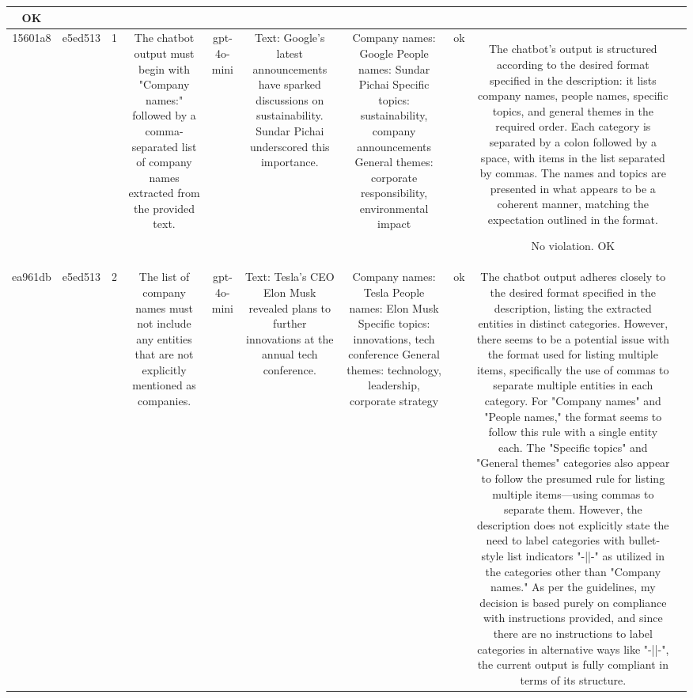 \begin{table}[h!]
\begin{tabular}{|c|c|c|c|c|c|c|c|c|c|}
OK & \\
\hline
15601a8 & e5ed513 & 1 & The chatbot output must begin with "Company names:" followed by a comma-separated list of company names extracted from the provided text. & gpt-4o-mini & Text: Google's latest announcements have sparked discussions on sustainability. Sundar Pichai underscored this importance. & Company names: Google
People names: Sundar Pichai
Specific topics: sustainability, company announcements
General themes: corporate responsibility, environmental impact & ok & The chatbot's output is structured according to the desired format specified in the description: it lists company names, people names, specific topics, and general themes in the required order. Each category is separated by a colon followed by a space, with items in the list separated by commas. The names and topics are presented in what appears to be a coherent manner, matching the expectation outlined in the format.

No violation.
OK & \\
\hline
ea961db & e5ed513 & 2 & The list of company names must not include any entities that are not explicitly mentioned as companies. & gpt-4o-mini & Text: Tesla's CEO Elon Musk revealed plans to further innovations at the annual tech conference. & Company names: Tesla
People names: Elon Musk
Specific topics: innovations, tech conference
General themes: technology, leadership, corporate strategy & ok & The chatbot output adheres closely to the desired format specified in the description, listing the extracted entities in distinct categories. However, there seems to be a potential issue with the format used for listing multiple items, specifically the use of commas to separate multiple entities in each category. For "Company names" and "People names," the format seems to follow this rule with a single entity each. The "Specific topics" and "General themes" categories also appear to follow the presumed rule for listing multiple items—using commas to separate them. However, the description does not explicitly state the need to label categories with bullet-style list indicators "-||-" as utilized in the categories other than "Company names." As per the guidelines, my decision is based purely on compliance with instructions provided, and since there are no instructions to label categories in alternative ways like "-||-", the current output is fully compliant in terms of its structure. 


\end{tabular}
\end{table}
